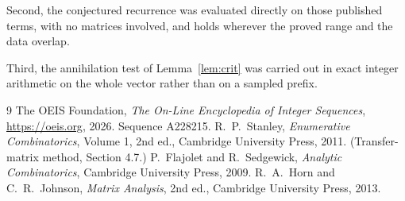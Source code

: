 \documentclass[11pt,a4paper]{article}
\theoremstyle{plain}
\theoremstyle{definition}
\begin{document}
Second, the conjectured recurrence was evaluated directly on those published terms, with no
matrices involved, and holds wherever the proved range and the data overlap.

Third, the annihilation test of Lemma~\ref{lem:crit} was carried out in exact integer
arithmetic on the whole vector rather than on a sampled prefix.

\begin{thebibliography}{9}
 The OEIS Foundation, \emph{The On-Line Encyclopedia of Integer
Sequences}, \url{https://oeis.org}, 2026. Sequence A228215.
 R.~P.~Stanley, \emph{Enumerative Combinatorics}, Volume 1, 2nd ed.,
Cambridge University Press, 2011. (Transfer-matrix method, Section 4.7.)
 P.~Flajolet and R.~Sedgewick, \emph{Analytic Combinatorics}, Cambridge
University Press, 2009.
 R.~A.~Horn and C.~R.~Johnson, \emph{Matrix Analysis}, 2nd ed., Cambridge
University Press, 2013.
\end{thebibliography}
\end{document}
